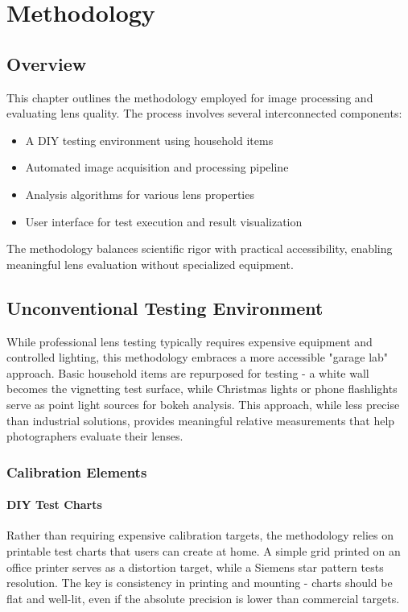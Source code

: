 \chapter{Methodology}

\section{Overview}
This chapter outlines the methodology employed for image processing and evaluating lens quality. The process involves several interconnected components:
\begin{itemize}
    \item A DIY testing environment using household items
    \item Automated image acquisition and processing pipeline
    \item Analysis algorithms for various lens properties
    \item User interface for test execution and result visualization
\end{itemize}

The methodology balances scientific rigor with practical accessibility, enabling meaningful lens evaluation without specialized equipment.

\section{Unconventional Testing Environment}
While professional lens testing typically requires expensive equipment and controlled lighting, this methodology embraces a more accessible "garage lab" approach. Basic household items are repurposed for testing - a white wall becomes the vignetting test surface, while Christmas lights or phone flashlights serve as point light sources for bokeh analysis. This approach, while less precise than industrial solutions, provides meaningful relative measurements that help photographers evaluate their lenses.

\subsection{Calibration Elements}
\subsubsection{DIY Test Charts}
Rather than requiring expensive calibration targets, the methodology relies on printable test charts that users can create at home. A simple grid printed on an office printer serves as a distortion target, while a Siemens star pattern tests resolution. The key is consistency in printing and mounting - charts should be flat and well-lit, even if the absolute precision is lower than commercial targets.

